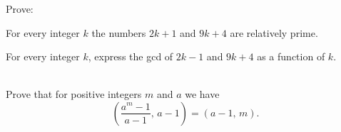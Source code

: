 \documentclass[a4paper,11pt]{article}
\theoremstyle{mythm}
\theoremstyle{mydef}
\begin{document}
 Prove:
\begin{enumerate*}[{\bf (a)}]
\item For every integer $k$ the numbers $2k+1$ and $9k+4$ are relatively prime.
\item For every integer $k$, express the gcd of $2k-1$ and $9k+4$ as a function
  of $k$.
\end{enumerate*} \\

 Prove that for positive integers $m$ and $a$ we have
\[
  \left(
    \frac{a^m-1}{a-1},\,a-1
  \right)
  = (a-1,\,m).
\]
\end{document}
